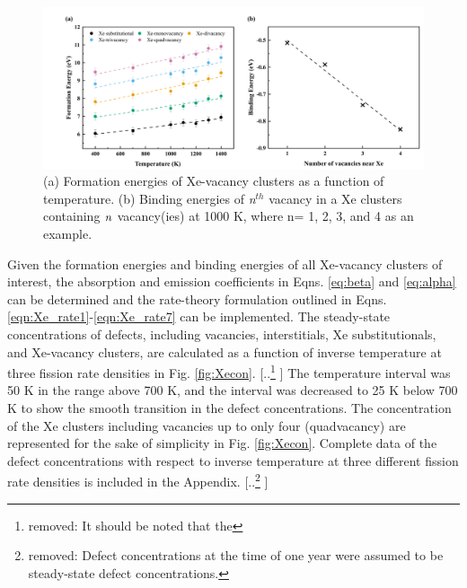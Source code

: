 \documentclass[preprint,12pt]{elsarticle}
\providecommand{\DIFadd}[1]{{\protect\color{blue} \sf #1}} %
\providecommand{\DIFdel}[1]{{\protect\color{red} [..\footnote{removed: #1} ]}} %
\providecommand{\DIFaddbegin}{} %
\providecommand{\DIFaddend}{} %
\providecommand{\DIFdelbegin}{} %
\providecommand{\DIFdelend}{} %
\newcommand{\DIFscaledelfig}{0.5}
\newlength{\DIFdelgraphicswidth} %
\newlength{\DIFdelgraphicsheight} %
\newcommand{\DIFaddincludegraphics}[2][]{{\color{blue}\fbox{\DIFOincludegraphics[#1]{#2}}}} %
\newcommand{\DIFdelincludegraphics}[2][]{%
\sbox{\DIFdelgraphicsbox}{\DIFOincludegraphics[#1]{#2}}%
\settoboxwidth{\DIFdelgraphicswidth}{\DIFdelgraphicsbox} %
\settoboxtotalheight{\DIFdelgraphicsheight}{\DIFdelgraphicsbox} %
\scalebox{\DIFscaledelfig}{%
\parbox[b]{\DIFdelgraphicswidth}{\usebox{\DIFdelgraphicsbox}\\[-\baselineskip] \rule{\DIFdelgraphicswidth}{0em}}\llap{\resizebox{\DIFdelgraphicswidth}{\DIFdelgraphicsheight}{%
\setlength{\unitlength}{\DIFdelgraphicswidth}%
\begin{picture}(1,1)%
\thicklines\linethickness{2pt} %
{\color[rgb]{1,0,0}\put(0,0){\framebox(1,1){}}}%
{\color[rgb]{1,0,0}\put(0,0){\line( 1,1){1}}}%
{\color[rgb]{1,0,0}\put(0,1){\line(1,-1){1}}}%
\end{picture}%
}\hspace*{3pt}}} %
} %
\DeclareRobustCommand{\DIFaddbegin}{\DIFOaddbegin \let\includegraphics\DIFaddincludegraphics} %
\DeclareRobustCommand{\DIFaddend}{\DIFOaddend \let\includegraphics\DIFOincludegraphics} %
\DeclareRobustCommand{\DIFdelbegin}{\DIFOdelbegin \let\includegraphics\DIFdelincludegraphics} %
\DeclareRobustCommand{\DIFdelend}{\DIFOaddend \let\includegraphics\DIFOincludegraphics} %
\begin{document}
\begin{figure}[hbt!]
\centering
\includegraphics[width=1\textwidth]{Fig7.png}
\caption{(a) Formation energies of Xe-vacancy clusters as a function of temperature. (b) Binding energies of \textit{n}$^{th}$ vacancy in a Xe clusters containing $\it{n}$ vacancy(ies) at 1000 K, where n= 1, 2, 3, and 4 as an example.}
\label{fig:FEBE77}
\end{figure}

Given the formation energies and binding energies of all Xe-vacancy clusters of interest, the absorption and emission coefficients in Eqns. \ref{eq:beta} and \ref{eq:alpha} can be determined and the rate-theory formulation outlined in Eqns. \ref{eqn:Xe_rate1}-\ref{eqn:Xe_rate7} can be implemented. The steady-state concentrations of defects, including vacancies, interstitials, Xe substitutionals, and Xe-vacancy clusters, are calculated as a function of inverse temperature at three fission rate densities in Fig. \ref{fig:Xecon}. \DIFdelbegin \DIFdel{It should be noted that the }\DIFdelend \DIFaddbegin \DIFadd{The temperature interval was 50 K in the range above 700 K, and the interval was decreased to 25 K below 700 K to show the smooth transition in the defect concentrations. The }\DIFaddend concentration of the Xe clusters including vacancies up to only four (quadvacancy) are represented for the sake of simplicity in Fig. \ref{fig:Xecon}. Complete data \DIFaddbegin \DIFadd{of the defect concentrations with respect to inverse temperature at three different fission rate densities }\DIFaddend is included in the Appendix. 
\DIFdelbegin \DIFdel{Defect concentrations at the time of one year were assumed to be steady-state defect concentrations. }\DIFdelend \DIFaddbegin 
\end{document}

